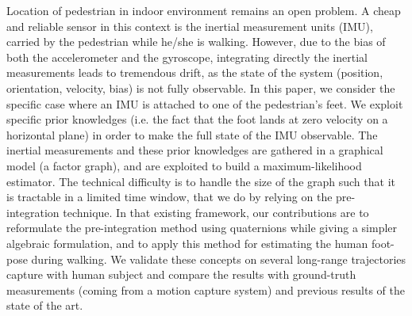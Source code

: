 %
%
Location of pedestrian in indoor environment remains an open problem.
A cheap and reliable sensor in this context is the inertial measurement units (IMU), carried by the pedestrian while he/she is walking.
However, due to the bias of both the accelerometer and the gyroscope, integrating directly the inertial measurements leads to tremendous drift, as the state of the system (position, orientation, velocity, bias) is not fully observable. 
In this paper, we consider the specific case where an IMU is attached to one of the pedestrian's feet.
We exploit specific prior knowledges (i.e. the fact that the foot lands at zero velocity on a horizontal plane) in order to make the full state of the IMU observable.
The inertial measurements and these prior knowledges are gathered in a graphical model (a factor graph), and are exploited to build a maximum-likelihood estimator.
The technical difficulty is to handle the size of the graph such that it is tractable in a limited time window, that we do by relying on the pre-integration technique.
In that existing framework, our contributions are to reformulate the pre-integration method using quaternions while giving a simpler algebraic formulation, and to apply this method for estimating the human foot-pose during walking.
We validate these concepts on several long-range trajectories capture with human subject and compare the results with ground-truth measurements (coming from a motion capture system)  and previous results of the state of the art.



